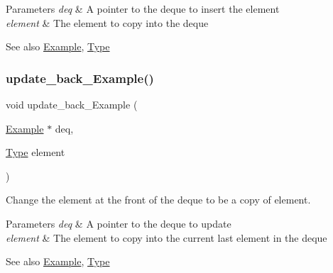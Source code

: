 \begin{DoxyParams}{Parameters}
{\em deq} & A pointer to the deque to insert the element\\
\hline
{\em element} & The element to copy into the deque\\
\hline
\end{DoxyParams}
\begin{DoxySeeAlso}{See also}
\hyperlink{structExample}{Example}, \hyperlink{group__DEQUE_gac9c83c2070eb6b5891cf742b90f54c68}{Type} 
\end{DoxySeeAlso}
\mbox{\label{group__DEQUE_ga0705ac52e0952213b9f1ce7f80bf977e}} 
\subsubsection{\texorpdfstring{update\+\_\+back\+\_\+\+Example()}{update\_back\_Example()}}
{\footnotesize\ttfamily void update\+\_\+back\+\_\+\+Example (\begin{DoxyParamCaption}\item[{\hyperlink{structExample}{Example} $\ast$}]{deq,  }\item[{\hyperlink{group__DEQUE_gac9c83c2070eb6b5891cf742b90f54c68}{Type}}]{element }\end{DoxyParamCaption})}



Change the element at the front of the deque to be a copy of element. 


\begin{DoxyParams}{Parameters}
{\em deq} & A pointer to the deque to update\\
\hline
{\em element} & The element to copy into the current last element in the deque\\
\hline
\end{DoxyParams}
\begin{DoxySeeAlso}{See also}
\hyperlink{structExample}{Example}, \hyperlink{group__DEQUE_gac9c83c2070eb6b5891cf742b90f54c68}{Type} 
\end{DoxySeeAlso}
\mbox{\label{group__DEQUE_ga2f5457e6575eb38d59b7504770ca247e}} 

